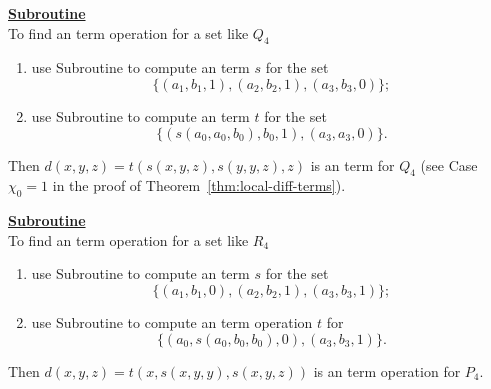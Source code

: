 \medskip

\noindent \underline{\textbf{Subroutine }}\\[4pt]
To find an \ld term operation for a set like $Q_4$
\begin{enumerate}
\item 
use Subroutine  to compute an \ld term $s$ for the set
\begin{equation*}
\{(a_1, b_1, 1), (a_2, b_2, 1), (a_3, b_3, 0)\};
\end{equation*}
\item  use Subroutine  to compute an \ld term $t$
for the set
\begin{equation*}
\{(s(a_0, a_0, b_0), b_0, 1),  (a_3,a_3,0)\}.
\end{equation*}
\end{enumerate}
Then 
$d(x,y,z) = t(s(x,y,z), s(y,y,z),z)$
is an \ld term  for $Q_4$ (see Case $\chi_0=1$ in the proof of Theorem~\ref{thm:local-diff-terms}).


\medskip

\noindent \underline{\textbf{Subroutine }}\\[4pt]
To find an \ld term operation for a set like $R_4$
\begin{enumerate}
\item 
use Subroutine  to compute an \ld term $s$ for the set
\begin{equation*}
\{(a_1, b_1, 0), (a_2, b_2, 1), (a_3, b_3, 1)\};
\end{equation*}
\item use Subroutine  to compute an \ld term operation $t$ for
\begin{equation*}
\{(a_0, s(a_0, b_0, b_0), 0), (a_3, b_3, 1)\}.
\end{equation*}
\end{enumerate}
Then 
$d(x,y,z) = t(x, s(x,y,y), s(x,y,z))$
is an \ld term operation for $P_4$. 
